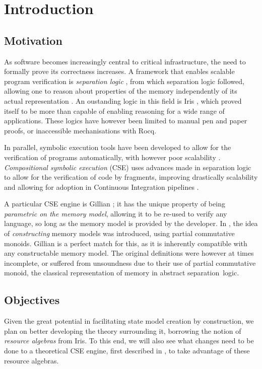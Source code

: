 \chapter{Introduction}

\section{Motivation}

As software becomes increasingly central to critical infrastructure, the need to formally prove its correctness increases. A framework that enables scalable program verification is \emph{separation logic} \cite{seplogic1,seplogic2}, from which  separation logic followed, allowing one to reason about properties of the memory independently of its actual representation \cite{higherorderseplogic,abstractseplogic}. An oustanding logic in this field is Iris \cite{iris}, which proved itself to be more than capable of enabling reasoning for a wide range of applications. These logics have however been limited to manual pen and paper proofs, or inaccessible mechanisations with Rocq.

In parallel, symbolic execution tools have been developed to allow for the verification of programs automatically, with however poor scalability \cite{pathexplo}. \emph{Compositional symbolic execution} (CSE) uses advances made in separation logic to allow for the verification of code by fragments, improving drastically scalability and allowing for adoption in Continuous Integration pipelines \cite{pulse}.

A particular CSE engine is Gillian \cite{gillian0}; it has the unique property of being \emph{parametric on the memory model}, allowing it to be re-used to verify any language, so long as the memory model is provided by the developer. In \cite{sacha-phd}, the idea of \emph{constructing} memory models was introduced, using partial commutative monoids. Gillian is a perfect match for this, as it is inherently compatible with any constructable memory model. The original definitions were however at times incomplete, or suffered from unsoundness due to their use of partial commutative monoid, the classical representation of memory in abstract separation~logic.

\section{Objectives}

Given the great potential in facilitating state model creation by construction, we plan on better developing the theory surrounding it, borrowing the notion of \emph{resource algebras} from Iris. To this end, we will also see what changes need to be done to a theoretical CSE engine, first described in \cite{cse1,cse2}, to take advantage of these resource algebras.

